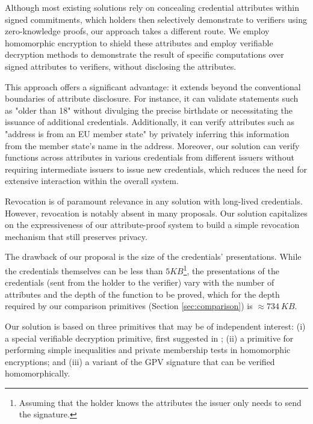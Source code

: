Although most existing solutions rely on concealing credential attributes within signed commitments, which holders then selectively demonstrate to verifiers using zero-knowledge proofs, our approach takes a different route. We employ homomorphic encryption to shield these attributes and employ verifiable decryption methods to demonstrate the result of specific computations over signed attributes to verifiers, without disclosing the attributes.

This approach offers a significant advantage: it extends beyond the conventional boundaries of attribute disclosure. For instance, it can validate statements such as "older than 18" without divulging the precise birthdate or necessitating the issuance of additional credentials. Additionally, it can verify attributes such as "address is from an EU member state" by privately inferring this information from the member state's name in the address. Moreover, our solution can verify functions across attributes in various credentials from different issuers without requiring intermediate issuers to issue new credentials, which reduces the need for extensive interaction within the overall system.

Revocation is of paramount relevance in any solution with long-lived credentials. However, revocation is notably absent in many proposals. Our solution capitalizes on the expressiveness of our attribute-proof system to build a simple revocation mechanism that still preserves privacy.

The drawback of our proposal is the size of the credentials' presentations. While the credentials themselves can be less than $5KB$\footnote{Assuming that the holder knows the attributes the issuer only needs to send the signature.}, the presentations of the credentials (sent from the holder to the verifier) vary with the number of attributes and the depth of the function to be proved, which for the depth required by our comparison primitives (Section \ref{sec:comparison}) is $\approx734~KB$.

Our solution is based on three primitives that may be of independent interest: (i) a special verifiable decryption primitive, first suggested in \cite{chillottiHomomorphicLWEBased2016}; (ii) a primitive for performing simple inequalities and private membership tests in homomorphic encryptions; and (iii) a variant of the GPV signature that can be verified homomorphically.
